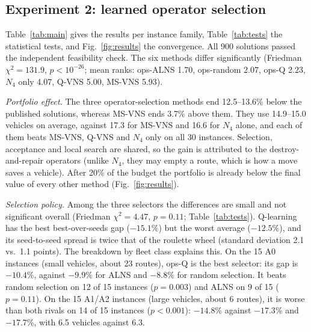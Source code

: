 \documentclass[conference]{IEEEtran}
\begin{document}
\subsection{Experiment 2: learned operator selection}
Table~\ref{tab:main} gives the results per instance family, Table~\ref{tab:tests} the statistical tests, and Fig.~\ref{fig:results} the convergence. All 900 solutions passed the independent feasibility check. The six methods differ significantly (Friedman $\chi^2=131.9$, $p<10^{-26}$; mean ranks: ops-ALNS 1.70, ops-random 2.07, ops-Q 2.23, $N_4$ only 4.07, Q-VNS 5.00, MS-VNS 5.93).

\textit{Portfolio effect.} The three operator-selection methods end 12.5--13.6\% below the published solutions, whereas MS-VNS ends 3.7\% above them. They use 14.9--15.0 vehicles on average, against 17.3 for MS-VNS and 16.6 for $N_4$ alone, and each of them beats MS-VNS, Q-VNS and $N_4$ only on all 30 instances. Selection, acceptance and local search are shared, so the gain is attributed to the destroy-and-repair operators (unlike $N_4$, they may empty a route, which is how a move saves a vehicle). After 20\% of the budget the portfolio is already below the final value of every other method (Fig.~\ref{fig:results}).

\textit{Selection policy.} Among the three selectors the differences are small and not significant overall (Friedman $\chi^2=4.47$, $p=0.11$; Table~\ref{tab:tests}). Q-learning has the best best-over-seeds gap ($-15.1\%$) but the worst average ($-12.5\%$), and its seed-to-seed spread is twice that of the roulette wheel (standard deviation 2.1 vs.\ 1.1 points). The breakdown by fleet class explains this. On the 15 A0 instances (small vehicles, about 23 routes), ops-Q is the best selector: its gap is $-10.4\%$, against $-9.9\%$ for ALNS and $-8.8\%$ for random selection. It beats random selection on 12 of 15 instances ($p=0.003$) and ALNS on 9 of 15 ($p=0.11$). On the 15 A1/A2 instances (large vehicles, about 6 routes), it is worse than both rivals on 14 of 15 instances ($p<0.001$): $-14.8\%$ against $-17.3\%$ and $-17.7\%$, with 6.5 vehicles against 6.3.
\end{document}
